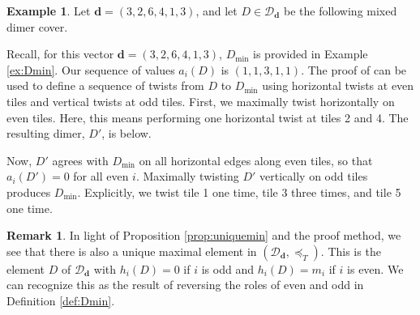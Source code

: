 \documentclass{amsart}
\theoremstyle{definition}
\newtheorem{example}[theorem]{Example}
\newtheorem{remark}[theorem]{Remark}
\begin{document}
\begin{example}
Let $\mathbf{d} = (3,2,6,4,1,3)$, and let $D\in \mathcal{D}_{\mathbf{d}}$ be the following mixed dimer cover.
\begin{center}
\end{center}
Recall, for this vector $\mathbf{d} = (3,2,6,4,1,3)$, $D_{\min}$ is provided in Example \ref{ex:Dmin}. Our sequence of values $a_i(D)$ is $(1,1,3,1,1)$. The proof of  can be used to define a sequence of twists from $D$ to $D_{\min}$ using horizontal twists at even tiles and vertical twists at odd tiles. First, we maximally twist horizontally on even tiles. Here, this means performing one horizontal twist at tiles 2 and 4. The resulting dimer, $D'$, is below. 

\begin{center}
\end{center}

Now, $D'$ agrees with $D_{\min}$ on all horizontal edges along even tiles, so that $a_i(D') =0 $ for all even $i$. Maximally twisting $D'$ vertically on odd tiles produces $D_{\min}$. Explicitly, we twist tile 1 one time, tile 3 three times, and tile 5 one time. 
\end{example}


\begin{remark}
 In light of Proposition \ref{prop:uniquemin} and the proof method, we see that there is also a unique maximal element in $(\mathcal{D}_{\mathbf{d}},\preceq_T)$. This is the element $D$ of $\mathcal{D}_{\mathbf{d}}$ with $h_i(D) = 0$ if $i$ is odd and $h_i(D) = m_i$ if $i$ is even. We can recognize this as the result of reversing the roles of even and odd in Definition \ref{def:Dmin}.
\end{remark}
\end{document}
